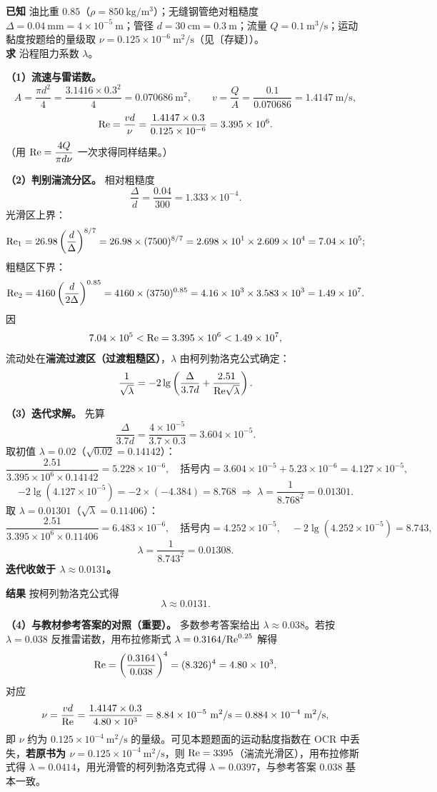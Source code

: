 \begin{jie}
\textbf{已知} 油比重 $0.85$（$\rho=850\ \mathrm{kg/m^3}$）；无缝钢管绝对粗糙度 $\Delta=0.04\ \mathrm{mm}=4\times10^{-5}\ \mathrm{m}$；管径 $d=30\ \mathrm{cm}=0.3\ \mathrm{m}$；流量 $Q=0.1\ \mathrm{m^3/s}$；运动黏度按题给的量级取 $\nu=0.125\times10^{-6}\ \mathrm{m^2/s}$（见〔存疑〕）。\\
\textbf{求} 沿程阻力系数 $\lambda$。

\textbf{（1）流速与雷诺数。}
\[A=\frac{\pi d^2}{4}=\frac{3.1416\times0.3^2}{4}=0.070686\ \mathrm{m^2},\qquad
v=\frac{Q}{A}=\frac{0.1}{0.070686}=1.4147\ \mathrm{m/s},\]
\[\mathrm{Re}=\frac{vd}{\nu}=\frac{1.4147\times0.3}{0.125\times10^{-6}}=3.395\times10^6.\]
（用 $\mathrm{Re}=\dfrac{4Q}{\pi d\nu}$ 一次求得同样结果。）

\textbf{（2）判别湍流分区。} 相对粗糙度
\[\frac{\Delta}{d}=\frac{0.04}{300}=1.333\times10^{-4}.\]
光滑区上界：
\[\mathrm{Re}_1=26.98\left(\frac{d}{\Delta}\right)^{8/7}=26.98\times(7500)^{8/7}=2.698\times10^1\times2.609\times10^4=7.04\times10^5;\]
粗糙区下界：
\[\mathrm{Re}_2=4160\left(\frac{d}{2\Delta}\right)^{0.85}=4160\times(3750)^{0.85}=4.16\times10^3\times3.583\times10^3=1.49\times10^7.\]
因
\[7.04\times10^5<\mathrm{Re}=3.395\times10^6<1.49\times10^7,\]
流动处在\textbf{湍流过渡区（过渡粗糙区）}，$\lambda$ 由柯列勃洛克公式确定：
\[\frac{1}{\sqrt{\lambda}}=-2\lg\left(\frac{\Delta}{3.7d}+\frac{2.51}{\mathrm{Re}\sqrt{\lambda}}\right).\]

\textbf{（3）迭代求解。} 先算
\[\frac{\Delta}{3.7d}=\frac{4\times10^{-5}}{3.7\times0.3}=3.604\times10^{-5}.\]
取初值 $\lambda=0.02$（$\sqrt{0.02}=0.14142$）：
\[\frac{2.51}{3.395\times10^6\times0.14142}=5.228\times10^{-6},\quad\text{括号内}=3.604\times10^{-5}+5.23\times10^{-6}=4.127\times10^{-5},\]
\[-2\lg\left(4.127\times10^{-5}\right)=-2\times(-4.384)=8.768\;\Longrightarrow\;\lambda=\frac{1}{8.768^2}=0.01301.\]
取 $\lambda=0.01301$（$\sqrt{\lambda}=0.11406$）：
\[\frac{2.51}{3.395\times10^6\times0.11406}=6.483\times10^{-6},\quad\text{括号内}=4.252\times10^{-5},\quad-2\lg\left(4.252\times10^{-5}\right)=8.743,\]
\[\lambda=\frac{1}{8.743^2}=0.01308.\]
\textbf{迭代收敛于 $\lambda\approx0.0131$。}

\textbf{结果} 按柯列勃洛克公式得
\[\boxed{\lambda\approx0.0131}.\]

\textbf{（4）与教材参考答案的对照（重要）。} 多数参考答案给出 $\lambda\approx0.038$。若按 $\lambda=0.038$ 反推雷诺数，用布拉修斯式 $\lambda=0.3164/\mathrm{Re}^{0.25}$ 解得
\[\mathrm{Re}=\left(\frac{0.3164}{0.038}\right)^{4}=(8.326)^{4}=4.80\times10^3,\]
对应
\[\nu=\frac{vd}{\Rey}=\frac{1.4147\times0.3}{4.80\times10^3}=8.84\times10^{-5}\ \mathrm{m^2/s}=0.884\times10^{-4}\ \mathrm{m^2/s},\]
即 $\nu$ 约为 $0.125\times10^{-4}\ \mathrm{m^2/s}$ 的量级。可见本题题面的运动黏度指数在 OCR 中丢失，\textbf{若原书为 $\nu=0.125\times10^{-4}\ \mathrm{m^2/s}$}，则 $\mathrm{Re}=3395$（湍流光滑区），用布拉修斯式得 $\lambda=0.0414$，用光滑管的柯列勃洛克式得 $\lambda=0.0397$，与参考答案 $0.038$ 基本一致。


\end{jie}
